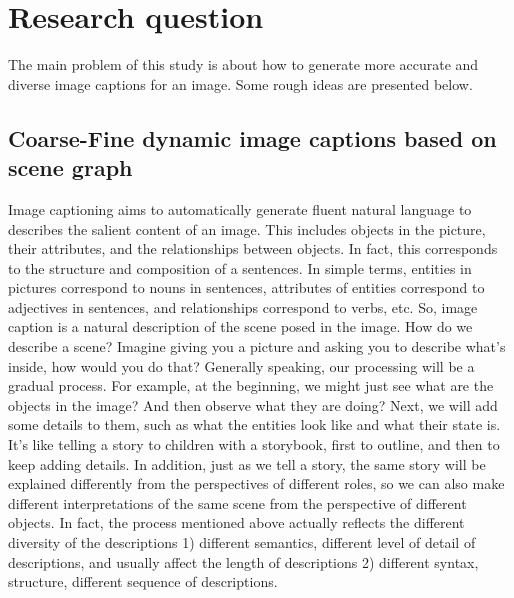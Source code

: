 \documentclass[12pt]{article}
\begin{document}
	\section{Research question}
	The main problem of this study is about how to generate more accurate and diverse image captions for an image. Some rough ideas are presented below.
	\subsection{Coarse-Fine dynamic image captions based on scene graph}
	Image captioning aims to automatically generate fluent natural language to describes the salient content of an image. This includes objects in the picture, their attributes, and the relationships between objects. In fact, this corresponds to the structure and composition of a sentences. In simple terms, entities in pictures correspond to nouns in sentences, attributes of entities correspond to adjectives in sentences, and relationships correspond to verbs, etc. So, image caption is a natural description of the scene posed in the image. How do we describe a scene? Imagine giving you a picture and asking you to describe what's inside, how would you do that? Generally speaking, our processing will be a gradual process. For example, at the beginning, we might just see what are the objects in the image? And then observe what they are doing? Next, we will add some details to them, such as what the entities look like and what their state is. It's like telling a story to children with a storybook, first to outline, and then to keep adding details. In addition, just as we tell a story, the same story will be explained differently from the perspectives of different roles, so we can also make different interpretations of the same scene from the perspective of different objects. In fact, the process mentioned above actually reflects the different diversity of the descriptions 1) different semantics, different level of detail of descriptions, and usually affect the length of descriptions 2) different syntax, structure, different sequence of descriptions.\par
\end{document}
